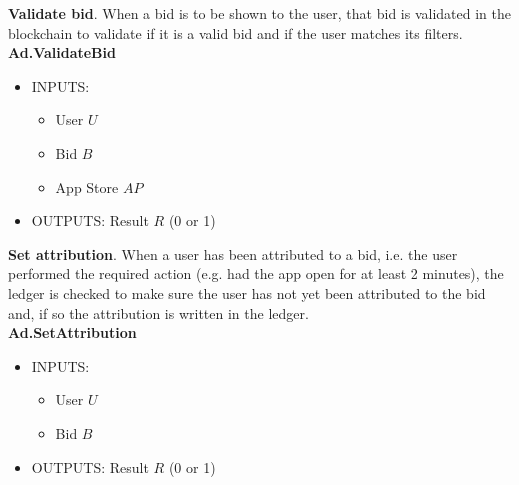 \noindent \textbf{Validate bid}. When a bid is to be shown to the user, that bid is validated in the blockchain to validate if it is a valid bid and if the user matches its filters. \\

\textbf{Ad.ValidateBid}
\vspace{-0.35cm}
\begin{itemize}
	\item INPUTS:
	\vspace{-0.35cm}
	\begin{itemize}
		\item User $U$
		\item Bid $B$
		\item App Store $AP$
	\end{itemize}
	\item OUTPUTS: Result $R$ (0 or 1)
\end{itemize}

\noindent \textbf{Set attribution}. When a user has been attributed to a bid, i.e. the user performed the required action (e.g. had the app open for at least 2 minutes), the ledger is checked to make sure the user has not yet been attributed to the bid and, if so the attribution is written in the ledger. \\

\textbf{Ad.SetAttribution}
\vspace{-0.35cm}
\begin{itemize}
	\item INPUTS:
	\vspace{-0.35cm}
	\begin{itemize}
		\item User $U$
		\item Bid $B$
	\end{itemize}
	\item OUTPUTS: Result $R$ (0 or 1)
\end{itemize}













			